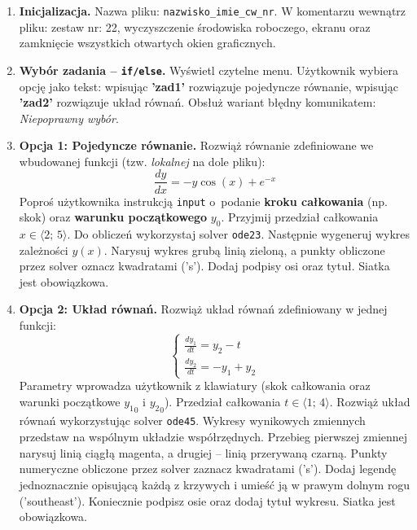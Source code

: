 \documentclass[a4paper,11pt]{article}
\begin{document}
\begin{enumerate}[leftmargin=*, label=\textbf{\arabic*.}, itemsep=2pt]

  \item \textbf{Inicjalizacja.}
    Nazwa pliku: \texttt{nazwisko\_imie\_cw\_nr}. W komentarzu wewnątrz pliku: zestaw nr: 22, wyczyszczenie środowiska roboczego, ekranu oraz zamknięcie wszystkich otwartych okien graficznych.

  \item \textbf{Wybór zadania -- \texttt{if/else}.}
    Wyświetl czytelne menu. Użytkownik wybiera opcję jako tekst: wpisując \textbf{'zad1'} rozwiązuje pojedyncze równanie, wpisując \textbf{'zad2'} rozwiązuje układ równań. Obsłuż wariant błędny komunikatem: \textit{Niepoprawny wybór}.

  \item \textbf{Opcja 1: Pojedyncze równanie.}
    Rozwiąż równanie zdefiniowane we wbudowanej funkcji (tzw. \textit{lokalnej} na dole pliku):
    \[ \frac{dy}{dx} = -y\cos(x) + e^{-x} \]
    Poproś użytkownika instrukcją \texttt{input} o~podanie \textbf{kroku całkowania} (np. skok) oraz \textbf{warunku początkowego} $y_0$. Przyjmij przedział całkowania $x \in \langle 2;\,5 \rangle$.
    Do obliczeń wykorzystaj solver \texttt{ode23}. Następnie wygeneruj wykres zależności $y(x)$. Narysuj wykres grubą linią zieloną, a punkty obliczone przez solver oznacz kwadratami ('s'). Dodaj podpisy osi oraz tytuł. Siatka jest obowiązkowa.

  \item \textbf{Opcja 2: Układ równań.}
    Rozwiąż układ równań zdefiniowany w jednej funkcji:\\[-0.5em]
    \[
    \begin{cases}
      \frac{dy_1}{dt} = y_2 - t \\
      \frac{dy_2}{dt} = -y_1 + y_2
    \end{cases}
    \]
    Parametry wprowadza użytkownik z klawiatury (skok całkowania oraz warunki początkowe $ {y_1}_{0} $ i $ {y_2}_{0} $). Przedział całkowania $t \in \langle 1;\,4 \rangle$.
    Rozwiąż układ równań wykorzystując solver \texttt{ode45}. Wykresy wynikowych zmiennych przedstaw na wspólnym układzie współrzędnych. Przebieg pierwszej zmiennej narysuj linią ciągłą magenta, a drugiej -- linią przerywaną czarną. Punkty numeryczne obliczone przez solver zaznacz kwadratami ('s'). Dodaj legendę jednoznacznie opisującą każdą z krzywych i umieść ją w prawym dolnym rogu ('southeast'). Koniecznie podpisz osie oraz dodaj tytuł wykresu. Siatka jest obowiązkowa.

\end{enumerate}
\end{document}
